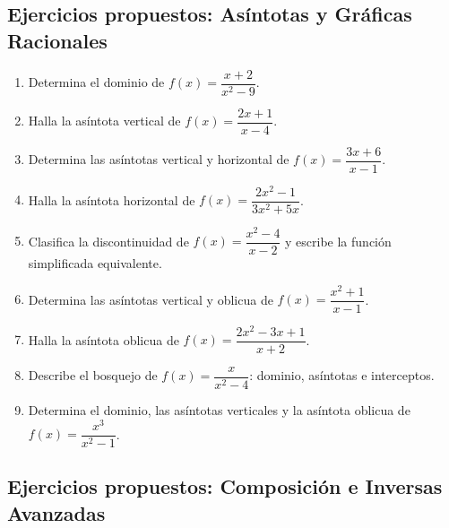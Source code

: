 \documentclass[12pt, letterpaper]{article}
\begin{document}

\subsection{Ejercicios propuestos: Asíntotas y Gráficas Racionales}

\begin{enumerate}[resume=ejercicios, leftmargin=*]
  \item \facil{} Determina el dominio de $f(x) = \dfrac{x + 2}{x^2 - 9}$.

  \item \facil{} Halla la asíntota vertical de $f(x) = \dfrac{2x + 1}{x - 4}$.

  \item \medio{} Determina las asíntotas vertical y horizontal de $f(x) = \dfrac{3x + 6}{x - 1}$.

  \item \medio{} Halla la asíntota horizontal de $f(x) = \dfrac{2x^2 - 1}{3x^2 + 5x}$.

  \item \medio{} Clasifica la discontinuidad de $f(x) = \dfrac{x^2 - 4}{x - 2}$ y escribe la función simplificada equivalente.

  \item \dificil{} Determina las asíntotas vertical y oblicua de $f(x) = \dfrac{x^2 + 1}{x - 1}$.

  \item \dificil{} Halla la asíntota oblicua de $f(x) = \dfrac{2x^2 - 3x + 1}{x + 2}$.

  \item \dificil{} Describe el bosquejo de $f(x) = \dfrac{x}{x^2 - 4}$: dominio, asíntotas e interceptos.

  \item \muyDificil{} Determina el dominio, las asíntotas verticales y la asíntota oblicua de $f(x) = \dfrac{x^3}{x^2 - 1}$.
\end{enumerate}

\subsection{Ejercicios propuestos: Composición e Inversas Avanzadas}
\end{document}
